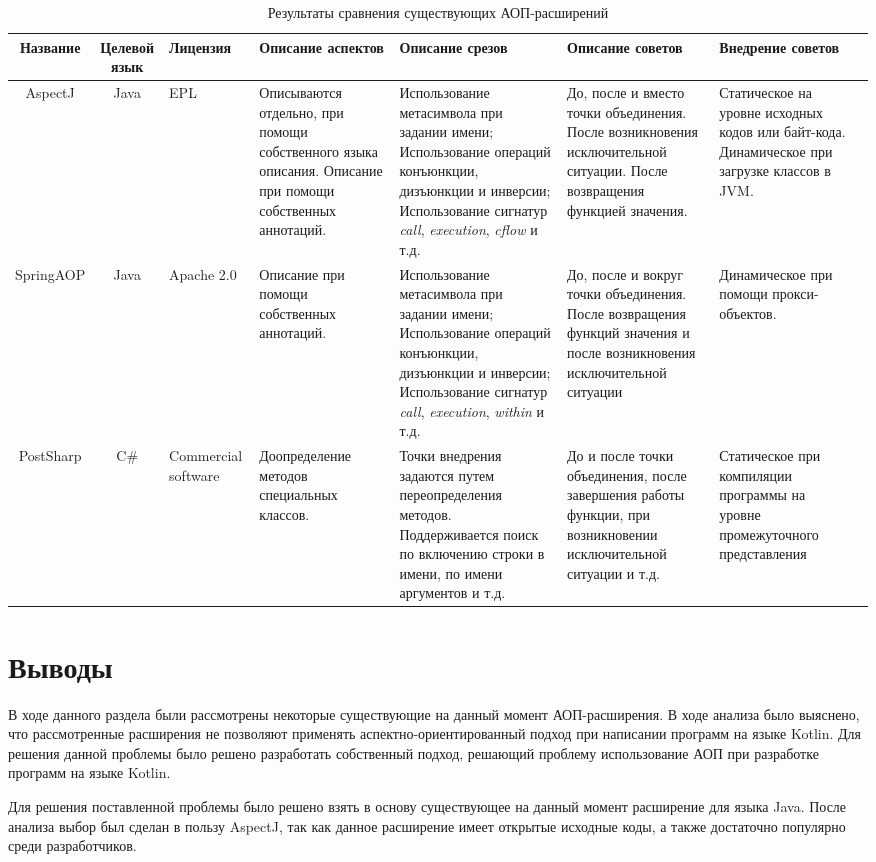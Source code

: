 \begin{sidewaystable}
\caption{Результаты сравнения существующих АОП-расширений}
\scriptsize
\begin{tabularx}{\textwidth}{|c|c|X|X|X|X|X|X|}
\hline
Название & Целевой язык & Лицензия & Описание аспектов & Описание срезов&Описание советов& Внедрение советов \\ \hline
AspectJ & Java & EPL & Описываются отдельно, при помощи собственного языка описания. Описание при помощи собственных аннотаций. & Использование метасимвола \quotes{*} при задании имени; Использование операций конъюнкции, дизъюнкции и инверсии; Использование сигнатур \textit{call}, \textit{execution}, \textit{cflow} и т.д. & До, после и вместо точки объединения. После возникновения исключительной ситуации. После возвращения функцией значения. & Статическое на уровне исходных кодов или байт-кода. Динамическое при загрузке классов в JVM. \\ \hline
SpringAOP & Java & Apache 2.0 & Описание при помощи собственных аннотаций. & Использование метасимвола \quotes{*} при задании имени; Использование операций конъюнкции, дизъюнкции и инверсии; Использование сигнатур \textit{call}, \textit{execution}, \textit{within} и т.д.  & До, после и вокруг точки объединения. После возвращения функций значения и после возникновения исключительной ситуации & Динамическое при помощи прокси-объектов. \\ \hline
PostSharp & C\# & Commercial software & Доопределение методов специальных классов. & Точки внедрения задаются путем переопределения методов. Поддерживается поиск по включению строки в имени, по имени аргументов и т.д.& До и после точки объединения, после завершения работы функции, при возникновении исключительной ситуации и т.д. & Статическое при компиляции программы на уровне промежуточного представления \\ \hline
\end{tabularx}
\label{tab:comparison_results}
\end{sidewaystable}
\section{Выводы}
\label{sec:cap_1_conclusion}
В ходе данного раздела были рассмотрены некоторые существующие на данный момент
АОП-расширения.
В ходе анализа было выяснено, что рассмотренные расширения не позволяют
применять аспектно-ориентированный подход при написании программ на языке
Kotlin.
Для решения данной проблемы было решено разработать собственный подход, решающий
проблему использование АОП при разработке программ на языке Kotlin.

Для решения поставленной проблемы было решено взять в основу существующее на
данный момент расширение для языка Java.
После анализа выбор был сделан в пользу AspectJ, так как данное расширение имеет
открытые исходные коды, а также достаточно популярно среди разработчиков.
